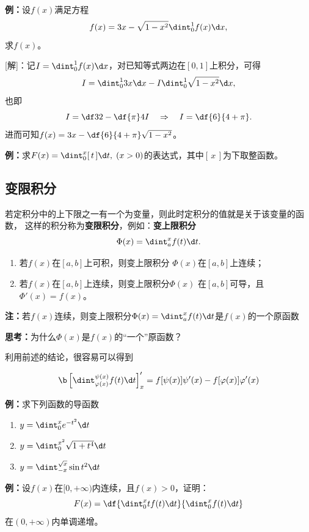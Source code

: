 {\bf 例：}设$f(x)$满足方程
$$f(x)=3x-\sqrt{1-x^2}\dint_0^1f(x)\d x,$$
求$f(x)$。

[解]：记$I=\dint_0^1f(x)\d x$，对已知等式两边在$[0,1]$上积分，可得
$$I=\dint_0^13x\d x-I\dint_0^1\sqrt{1-x^2}\d x,$$
也即
$$I=\df32-\df{\pi}4I
\quad\Rightarrow\quad
I=\df{6}{4+\pi}.$$
进而可知$f(x)=3x-\df{6}{4+\pi}\sqrt{1-x^2}$。\fin

{\bf 例：}求$F(x)=\dint_0^x[\,t\,]\d t,\;(x>0)$的表达式，其中$[\,x\,]$为下取整函数。

\subsection{变限积分}

若定积分中的上下限之一有一个为变量，则此时定积分的值就是关于该变量的函数，
这样的积分称为{\bf 变限积分}，例如：{\bf 变上限积分}
$$\Phi(x)=\dint_a^xf(t)\d t.$$

\begin{thx}
	\begin{enumerate}
	  \item 若$f(x)$在$[a,b]$上可积，则变上限积分
		$\Phi(x)$在$[a,b]$上连续；
	  \item 若$f(x)$在$[a,b]$上连续，则变上限积分$\Phi(x)$
	    在$[a,b]$可导，且$\Phi'(x)=f(x)$。
	\end{enumerate}
\end{thx}

{\bf 注：}若$f(x)$连续，则变上限积分$\Phi(x)=\dint_a^xf(t)\d t$是$f(x)$的一个原函数

{\bf 思考：}为什么$\Phi(x)$是$f(x)$的“一个”原函数？

利用前述的结论，很容易可以得到

\begin{thx}
	$${\b\left[\dint_{\varphi(x)}^{\psi(x)}f(t)\d t\right]'_x
	=f[\psi(x)]\psi'(x)-f[\varphi(x)]\varphi'(x)}$$
\end{thx}

{\bf 例：}求下列函数的导函数
\begin{enumerate}[(1)]
  \setlength{\itemindent}{1cm}
  \item $y=\dint_0^{x}e^{-t^2}\d t$
  \item $y=\dint_0^{x^2}\sqrt{1+t^4}\d t$
  \item $y=\dint_{-x}^{\sqrt x}\sin t^2\d t$
\end{enumerate}

{\bf 例：}设$f(x)$在$[0,+\infty)$内连续，且$f(x)>0$，证明：
$$F(x)=\df{\dint_0^xtf(t)\d t}{\dint_0^xf(t)\d t}$$
在$(0,+\infty)$内单调递增。

